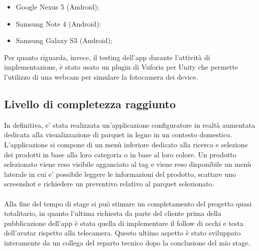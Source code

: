 \begin{itemize}
	\item Google Nexus 5 (Android);
	\item Samsung Note 4 (Android):
	\item Samsung Galaxy S3 (Android);
\end{itemize}

Per quanto riguarda, invece, il testing dell'app durante l'attivit\`a di implementazione, \`e stato usato un plugin di Vuforia per Unity che permette l'utilizzo di una webcam per simulare la fotocamera dei device.

\subsection{Livello di completezza raggiunto}
In definitiva, e' stata realizzata un'applicazione configuratore in realt\`a aumentata dedicata alla visualizzazione di parquet in legno in un contesto domestico. L'applicazione si compone di un men\`u inferiore dedicato alla ricerca e selezione dei prodotti in base alla loro categoria o in base al loro colore. Un prodotto selezionato viene reso visibile agganciato al tag e viene reso disponibile un men\`u laterale in cui e' possibile leggere le informazioni del prodotto, scattare uno screenshot e richiedere un preventivo relativo al parquet selezionato.\\\\

Alla fine del tempo di stage si pu\`o stimare un completamento del progetto quasi totalitario, in quanto l'ultima richiesta da parte del cliente prima della pubblicazione dell'app \`e stata quella di implementare il follow di occhi e testa dell'avatar rispetto alla telecamera. Questo ultimo aspetto \`e stato sviluppato interamente da un collega del reparto tecnico dopo la conclusione del mio stage.\\